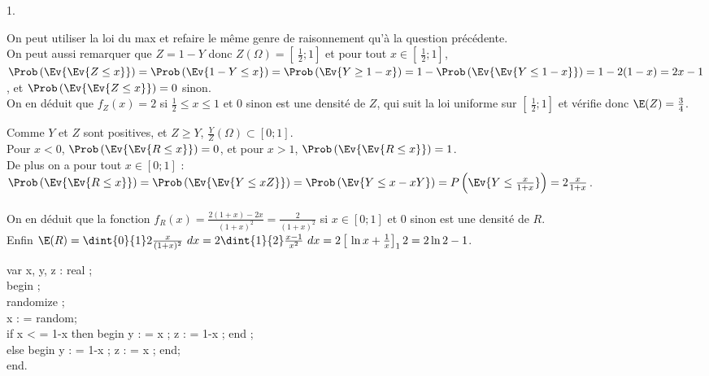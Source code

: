 \documentclass[11pt]{article}%
\begin{document}
\begin{exercice}
\begin{noliste}{1.}
 \item On peut utiliser la loi du max et refaire le même genre de
raisonnement qu'à la question précédente. \\
 On peut aussi remarquer que $Z = 1 - Y$ donc $Z (\Omega) = \left[ \
\frac{1}{2} ; 1\right]$ et pour tout $x \in \left[ \ \frac{1}{2} ;
1\right]$, $\Prob\left(\Ev{\Ev{ Z \leq x}}\right) = \Prob\left(\Ev{ 1 -
Y \leq x}\right) = \Prob\left(\Ev{ Y \geq 1 - x}\right) = 1 -
\Prob\left(\Ev{\Ev{ Y \leq 1-x}}\right) = 1 - 2 (1-x) = 2x - 1$, et
$\Prob\left(\Ev{\Ev{ Z \leq x}}\right) = 0$ sinon. \\
 On en déduit que $f_{Z}(x) = 2$ si $\frac{1}{2} \leq x \leq 1$ et 0
sinon est une densité de $Z$, qui suit la loi uniforme sur $\left[ \
\frac{1}{2} ; 1\right]$ et vérifie donc $\E(Z) = \frac{3}{4}$. \\

 \item Comme $Y$ et $Z$ sont positives, et $Z \geq Y$, $ \frac{Y}{Z}
(\Omega) \subset [ 0 ; 1]$. \\
 Pour $x < 0$, $\Prob\left(\Ev{\Ev{ R \leq x}}\right) = 0$, et pour $x
> 1$, $\Prob\left(\Ev{\Ev{ R \leq x}}\right) = 1$. \\
 De plus on a pour tout $x \in [ 0 ; 1]$ : \\
 $\Prob\left(\Ev{\Ev{ R \leq x}}\right) = \Prob\left(\Ev{\Ev{ Y \leq x
Z}}\right) = \Prob\left(\Ev{ Y \leq x - x Y}\right) = P \left(\Ev{ Y
\leq \frac{x}{1 + x}}\right) = 2 \frac{x}{1 + x}$. \\
\\
 On en déduit que la fonction $f_{R}(x) = \frac{2(1 + x) - 2x}{(1 +
x)^{2}} = \frac{2}{(1 + x)^{2}}$ si $x \in [ 0 ; 1]$ et 0 sinon est une
densité de $R$. \\
 Enfin $\E(R) = \dint{0}{1} 2 \frac{x}{ (1 + x)^{2}}\ dx = 2
\dint{1}{2} \frac{ x-1}{x^{2}}\ dx = 2 \left[ \ \ln x + \frac{1}{x}
\right]_{1}{2} = 2 \ln 2 -1$. \\

 \item var x, y, z : real ; \\
 begin ; \\
 randomize ; \\
 x : = random; \\
 if x < = 1-x then begin 
 y : = x ; z : = 1-x ; end ;\\
 else begin y : = 1-x ; z : = x ; end; \\
 end. \\
 \end{noliste}


\end{exercice}
\end{document}
